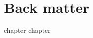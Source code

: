 \part{Back matter}

{chapter}
{chapter}


\begin{small}
    \printbibliography
\end{small}




\printindex
